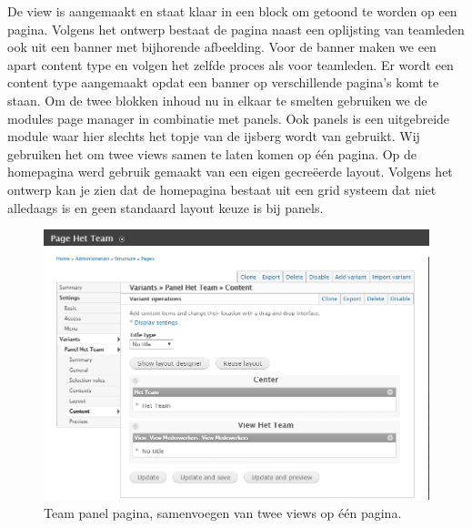 \noindent
De view is aangemaakt en staat klaar in een block om getoond te worden op een pagina. Volgens het ontwerp bestaat de pagina naast een oplijsting van teamleden ook uit een banner met bijhorende afbeelding. Voor de banner maken we een apart content type en volgen het zelfde proces als voor teamleden. Er wordt een content type aangemaakt opdat een banner op verschillende pagina's komt te staan. Om de twee blokken inhoud nu in elkaar te smelten gebruiken we de modules page manager in combinatie met panels. 
\newline\newline
Ook panels is een uitgebreide module waar hier slechts het topje van de ijsberg wordt van gebruikt. Wij gebruiken het om twee views samen te laten komen op één pagina. 
\newline\newline
Op de homepagina werd gebruik gemaakt van een eigen gecreëerde layout. Volgens het ontwerp kan je zien dat de homepagina bestaat uit een grid systeem dat niet alledaags is en geen standaard layout keuze is bij panels. 

\begin{figure}[!ht]
  \includegraphics[width=\textwidth]{img/dr-panels.png}
  \centering
  \caption{Team panel pagina, samenvoegen van twee views op één pagina.}
  \label{fig:Drupal page.}
\end{figure}

\pagebreak
